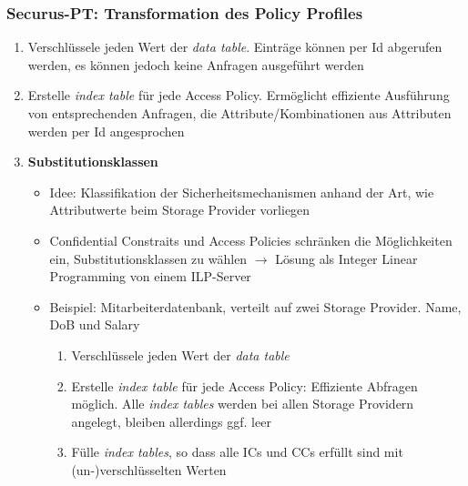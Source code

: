 \subsubsection{Securus-PT: Transformation des Policy Profiles}
\begin{enumerate}
	\item Verschlüssele jeden Wert der \textit{data table}. Einträge können per Id abgerufen werden, es können jedoch keine Anfragen ausgeführt werden
	\item Erstelle \textit{index table} für jede Access Policy. Ermöglicht effiziente Ausführung von entsprechenden Anfragen, die Attribute/Kombinationen aus Attributen werden per Id angesprochen
	\item \textbf{Substitutionsklassen}
	\begin{itemize}
		\item Idee: Klassifikation der Sicherheitsmechanismen anhand der Art, wie Attributwerte beim Storage Provider vorliegen
		\item Confidential Constraits und Access Policies schränken die Möglichkeiten ein, Substitutionsklassen zu wählen $\rightarrow$ Lösung als Integer Linear Programming von einem ILP-Server
		\item Beispiel: Mitarbeiterdatenbank, verteilt auf zwei Storage Provider. Name, DoB und Salary
		\begin{enumerate}
			\item Verschlüssele jeden Wert der \textit{data table}
			\item Erstelle \textit{index table} für jede Access Policy: Effiziente Abfragen möglich. Alle \textit{index tables} werden bei allen Storage Providern angelegt, bleiben allerdings ggf. leer
			\item Fülle \textit{index tables}, so dass alle ICs und CCs erfüllt sind mit (un-)verschlüsselten Werten
		\end{enumerate}
	\end{itemize}
\end{enumerate}

